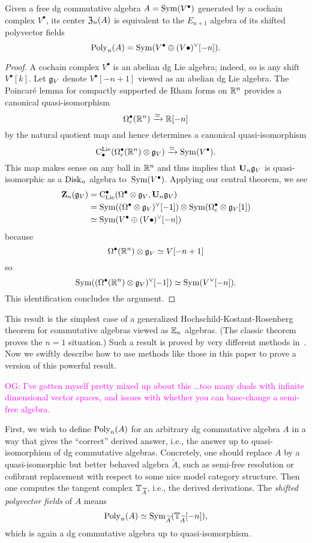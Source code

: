 \documentclass[11pt]{amsart}
\numberwithin{equation}{section}
\def\owen{\textcolor{magenta}{OG: }\textcolor{magenta}}
\begin{document}
\begin{prp}
Given a free dg commutative algebra $A = {\rm Sym}(V^\bullet)$ generated by a cochain complex $V^\bullet$,
its center ${\frak Z}_n(A)$ is equivalent to the $E_{n+1}$ algebra of its shifted polyvector fields 
\[
{\rm Poly}_n(A) = {\rm Sym}(V^\bullet \oplus (V\bullet)^\vee[-n]).
\]
\end{prp}

\begin{proof}
A cochain complex $V^\bullet$ is an abelian dg Lie algebra;
indeed, so is any shift $V^\bullet[k]$. 
Let $\mathfrak g_V$ denote $V^\bullet[-n+1]$ viewed as an abelian dg Lie algebra.
The Poincar\'e lemma for compactly supported de Rham forms on $\mathbb R^n$ provides a canonical quasi-isomorphism
\[
\Omega^\bullet_c(\mathbb R^n) \xrightarrow{\simeq} \mathbb R[-n]
\]
by the natural quotient map and hence determines a canonical quasi-isomorphism
\[
{\rm C}^{\rm Lie}_\bullet(\Omega^\bullet_c(\mathbb R^n) \otimes \mathfrak g_V) \xrightarrow{\simeq} {\rm Sym}(V^\bullet).
\]
This map makes sense on any ball in $\mathbb R^n$ and thus implies that $\mathbf U_n \mathfrak g_V$ is quasi-isomorphic as a ${\rm Disk}_n$ algebra to~${\rm Sym}(V^\bullet)$.
Applying our central theorem, we see
\begin{align*}
\mathbf Z_n(\mathfrak g_V) &= {\rm C}_{\rm Lie}^\bullet(\Omega^\bullet \otimes \mathfrak g_V, \mathbf U_n \mathfrak g_V) \\
&= {\rm Sym}((\Omega^\bullet \otimes \mathfrak g_V)^\vee[-1]) \otimes {\rm Sym}(\Omega^\bullet_c \otimes \mathfrak g_V[1])\\
& \simeq {\rm Sym}(V^\bullet \oplus (V\bullet)^\vee[-n])
\end{align*}
because
\[
\Omega^\bullet (\mathbb R^n) \otimes \mathfrak g_V \simeq V[-n+1]
\]
so
\[
{\rm Sym}( (\Omega^\bullet(\mathbb R^n) \otimes \mathfrak g_V)^\vee[-1]) \simeq {\rm Sym}( V^\vee[-n]).
\]
This identification concludes the argument.
\end{proof}

This result is the simplest case of a generalized Hochschild-Kostant-Rosenberg theorem for commutative algebras viewed as $\mathbb E_n$ algebras.
(The classic theorem proves the $n=1$ situation.)
Such a result is proved by very different methods in~\cite{CalWil, ToenBranes}.
Now we swiftly describe how to use methods like those in this paper to prove a version of this powerful result.

\owen{I've gotten myself pretty mixed up about this \dots too many duals with infinite dimensional vector spaces, and issues with whether you can base-change a semi-free algebra.}

First, we wish to define ${\rm Poly}_n(A)$ for an arbitrary dg commutative algebra $A$ in a way that gives the ``correct'' derived answer, i.e., the answer up to quasi-isomorphism of dg commutative algebras.
Concretely, one should replace $A$ by a quasi-isomorphic but better behaved algebra $\widetilde{A}$, 
such as semi-free resolution or cofibrant replacement with respect to some nice model category structure.
Then one computes the tangent complex $\mathbb T_{\widetilde{A}}$, i.e., the derived derivations.
The {\em shifted polyvector fields} of $A$ means
\[
{\rm Poly}_n(A) \simeq {\rm Sym}_{\widetilde{A}} (\mathbb T_{\widetilde{A}}[-n]),
\]
which is again a dg commutative algebra up to quasi-isomorphism.
\end{document}
